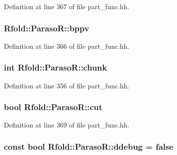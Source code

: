 Definition at line 367 of file part\+\_\+func.\+hh.

\hypertarget{class_rfold_1_1_paraso_r_a34ad7bc233e6711a93c7cb69c8ed9855}{
\subsubsection[{bppv}]{ Rfold\+::\+Paraso\+R\+::bppv}}\label{class_rfold_1_1_paraso_r_a34ad7bc233e6711a93c7cb69c8ed9855}


Definition at line 366 of file part\+\_\+func.\+hh.

\hypertarget{class_rfold_1_1_paraso_r_aafdf04b7ad506cfa1457bfefa3423e31}{
\subsubsection[{chunk}]{\setlength{\rightskip}{0pt plus 5cm}int Rfold\+::\+Paraso\+R\+::chunk}}\label{class_rfold_1_1_paraso_r_aafdf04b7ad506cfa1457bfefa3423e31}


Definition at line 356 of file part\+\_\+func.\+hh.

\hypertarget{class_rfold_1_1_paraso_r_afd1dd1d5fccc77e48fa36bb090be6735}{
\subsubsection[{cut}]{\setlength{\rightskip}{0pt plus 5cm}bool Rfold\+::\+Paraso\+R\+::cut}}\label{class_rfold_1_1_paraso_r_afd1dd1d5fccc77e48fa36bb090be6735}


Definition at line 369 of file part\+\_\+func.\+hh.

\hypertarget{class_rfold_1_1_paraso_r_ae9b7970e1a048776c3ae5ca788f7d760}{
\subsubsection[{ddebug}]{\setlength{\rightskip}{0pt plus 5cm}const bool Rfold\+::\+Paraso\+R\+::ddebug = false\hspace{0.3cm}{\ttfamily [static]}}}\label{class_rfold_1_1_paraso_r_ae9b7970e1a048776c3ae5ca788f7d760}


